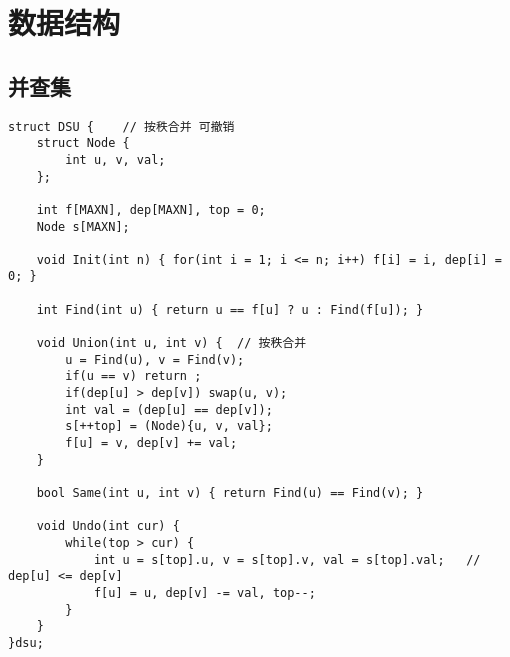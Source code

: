 \section{数据结构}

\subsection{并查集}
\begin{lstlisting}
struct DSU {    // 按秩合并 可撤销
	struct Node {
	    int u, v, val;
    };
    
    int f[MAXN], dep[MAXN], top = 0;
	Node s[MAXN];
	
	void Init(int n) { for(int i = 1; i <= n; i++) f[i] = i, dep[i] = 0; }
	
	int Find(int u) { return u == f[u] ? u : Find(f[u]); }
	
	void Union(int u, int v) {  // 按秩合并
		u = Find(u), v = Find(v);
		if(u == v) return ;
		if(dep[u] > dep[v]) swap(u, v);
		int val = (dep[u] == dep[v]);
		s[++top] = (Node){u, v, val};
		f[u] = v, dep[v] += val;
	}
	
	bool Same(int u, int v) { return Find(u) == Find(v); }
	
	void Undo(int cur) {
		while(top > cur) {
			int u = s[top].u, v = s[top].v, val = s[top].val;	// dep[u] <= dep[v]
			f[u] = u, dep[v] -= val, top--;
		}
	}
}dsu;
\end{lstlisting}

